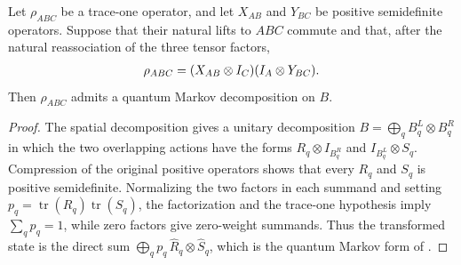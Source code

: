 \begin{lemma}
    \label{thm:positive_commuting_overlapping_product_markov}
    \leanok
    Let $\rho_{ABC}$ be a trace-one operator, and let $X_{AB}$ and $Y_{BC}$
    be positive semidefinite operators. Suppose that their natural lifts to
    $ABC$ commute and that, after the natural reassociation of the three
    tensor factors,
    \begin{align}
        \rho_{ABC}=(X_{AB}\otimes I_C)(I_A\otimes Y_{BC}).
        \notag
    \end{align}
    Then $\rho_{ABC}$ admits a quantum Markov decomposition on $B$.
\end{lemma}
\begin{proof}\leanok

    The spatial decomposition
    \cite[Lemma~2.1]{Beigi2012Classification} gives a unitary decomposition
    $B=\bigoplus_q B_q^L\otimes B_q^R$ in which the two overlapping actions
    have the forms $R_q\otimes I_{B_q^R}$ and
    $I_{B_q^L}\otimes S_q$. Compression of the original positive operators
    shows that every $R_q$ and $S_q$ is positive semidefinite. Normalizing the
    two factors in each summand and setting
    $p_q=\operatorname{tr}(R_q)\operatorname{tr}(S_q)$, the factorization and
    the trace-one hypothesis imply $\sum_q p_q=1$, while zero factors give
    zero-weight summands. Thus the transformed state is the direct sum
    $\bigoplus_q p_q\,\widehat R_q\otimes\widehat S_q$, which is the quantum
    Markov form of \cite[Theorem~6]{Hayden2004Structure}.
\end{proof}

